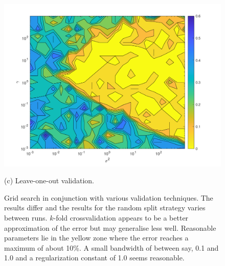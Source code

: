 \begin{figure}
\begin{minipage}{\linewidth}
    \includegraphics[width=\linewidth]{../src/figures/iris/validation_3}
    \caption*{(c) Leave-one-out validation.}
    \label{fig:5c}
\end{minipage}
\caption{Grid search in conjunction with various validation techniques. The results differ and the results for the random split strategy varies between runs. $k$-fold crossvalidation appears to be a better approximation of the error but may generalise less well. Reasonable parameters lie in the yellow zone where the error reaches a maximum of about 10\%. A small bandwidth of between say, 0.1 and 1.0 and a regularization constant of 1.0 seems reasonable.}
\label{validation}
\end{figure}

\endgroup





